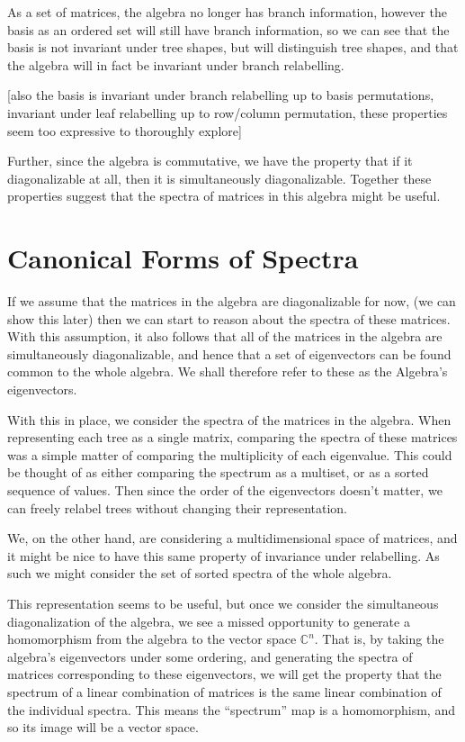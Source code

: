 \documentclass[10pt,a4paper]{report}
\begin{document}
As a set of matrices, the algebra no longer has branch information, however the
basis as an ordered set will still have branch information, so we can see that
the basis is not invariant under tree shapes, but will distinguish tree shapes,
and that the algebra will in fact be invariant under branch relabelling.

[also the basis is invariant under branch relabelling up to basis permutations,
invariant under leaf relabelling up to row/column permutation, these properties
seem too expressive to thoroughly explore]

Further, since the algebra is commutative, we have the property that if it
diagonalizable at all, then it is simultaneously diagonalizable.
Together these properties suggest that the spectra of matrices in this algebra
might be useful.

\section{Canonical Forms of Spectra}

If we assume that the matrices in the algebra are diagonalizable for now, (we
can show this later) then we can start to reason about the spectra of these
matrices.
With this assumption, it also follows that all of the matrices in the
algebra are simultaneously diagonalizable, and hence that a set of eigenvectors
can be found common to the whole algebra.
We shall therefore refer to these as the Algebra's eigenvectors.

With this in place, we consider the spectra of the matrices in the algebra.
When representing each tree as a single matrix, comparing the spectra of these
matrices was a simple matter of comparing the multiplicity of each eigenvalue.
This could be thought of as either comparing the spectrum as a multiset, or as
a sorted sequence of values.
Then since the order of the eigenvectors doesn't matter, we can freely relabel
trees without changing their representation.

We, on the other hand, are considering a multidimensional space of matrices,
and it might be nice to have this same property of invariance under
relabelling.
As such we might consider the set of sorted spectra of the whole algebra.

This representation seems to be useful, but once we consider the simultaneous
diagonalization of the algebra, we see a missed opportunity to generate a
homomorphism from the algebra to the vector space $\mathds{C}^n$.
That is, by taking the algebra's eigenvectors under some ordering, and
generating the spectra of matrices corresponding to these eigenvectors, we will
get the property that the spectrum of a linear combination of matrices is the
same linear combination of the individual spectra.
This means the ``spectrum'' map is a homomorphism, and so its image will be a
vector space.
\end{document}
